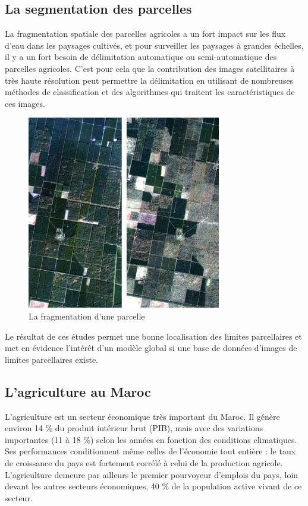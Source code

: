 \documentclass[12pt, openany]{report}
\begin{document}
\subsection{La segmentation des parcelles}

La fragmentation spatiale des parcelles agricoles a un fort impact sur les flux d’eau dans les paysages cultivés, et pour surveiller les paysages à grandes échelles, il y a un fort besoin de délimitation automatique ou semi-automatique des parcelles agricoles. C’est pour cela que la contribution des images satellitaires à très haute résolution peut permettre la délimitation en utilisant de nombreuses méthodes de classification et des algorithmes qui traitent les caractéristiques de ces images.\cite{frag}

\begin{figure}[hp]
\centering
\includegraphics[scale=1]{seg.jpg}
\caption{La fragmentation d'une parcelle}
\end{figure}

Le résultat de ces études permet une bonne localisation des limites parcellaires et met en évidence l’intérêt d’un modèle global si une base de données d’images de limites parcellaires existe. 

\newpage

\subsection{L'agriculture au Maroc}

L'agriculture est un secteur économique très important du Maroc. Il génère environ 14 \% du produit intérieur brut (PIB), mais avec des variations importantes (11 à 18 \%) selon les années en fonction des conditions climatiques. Ses performances conditionnent même celles de l’économie tout entière : le taux de croissance du pays est fortement corrélé à celui de la production agricole. L’agriculture demeure par ailleurs le premier pourvoyeur d’emplois du pays, loin devant les autres secteurs économiques, 40 \% de la population active vivant de ce secteur.\cite{imagesatt}
\end{document}
